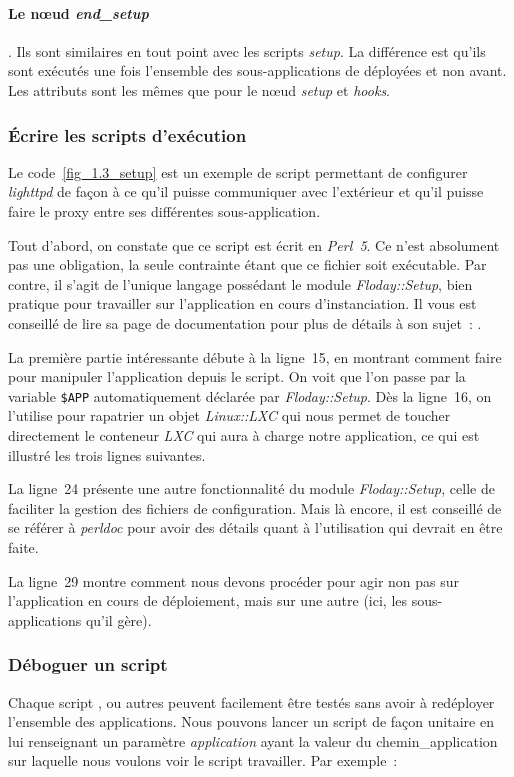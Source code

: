 \paragraph{Le nœud \emph{end\_setup}}. Ils sont similaires en tout point avec les scripts \emph{setup}. La différence est qu'ils sont exécutés une fois l'ensemble des sous-applications de déployées et non avant.
Les attributs sont les mêmes que pour le nœud \emph{setup} et \emph{hooks}.

\subsubsection{Écrire les scripts d'exécution}
 
Le code~\ref{fig_1.3_setup} est un exemple de script permettant de configurer \emph{lighttpd} de façon à ce qu'il puisse communiquer avec l'extérieur et qu'il puisse faire le proxy entre ses différentes \gls{sous-application}.



Tout d'abord, on constate que ce script est écrit en \emph{Perl~5}.
Ce n'est absolument pas une obligation, la seule contrainte étant que ce fichier soit exécutable.
Par contre, il s'agit de l'unique langage possédant le module \emph{Floday::Setup}, bien pratique pour travailler sur l'\gls{application} en cours d'instanciation.
Il vous est conseillé de lire sa page de documentation pour plus de détails à son sujet~: .

La première partie intéressante débute à la ligne~15, en montrant comment faire pour manipuler l'application depuis le script.
On voit que l'on passe par la variable {\tt\$APP} automatiquement déclarée par \emph{Floday::Setup}.
Dès la ligne~16, on l'utilise pour rapatrier un objet \emph{Linux::LXC} qui nous permet de toucher directement le conteneur \emph{LXC} qui aura à charge notre application, ce qui est illustré les trois lignes suivantes.

La ligne~24 présente une autre fonctionnalité du module \emph{Floday::Setup}, celle de faciliter la gestion des fichiers de configuration.
Mais là encore, il est conseillé de se référer à \emph{perldoc} pour avoir des détails quant à l'utilisation qui devrait en être faite.

La ligne~29 montre comment nous devons procéder pour agir non pas sur l'application en cours de déploiement, mais sur une autre (ici, les \glspl{sous-application} qu'il gère).

\subsubsection{Déboguer un script}
Chaque script ,  ou autres peuvent facilement être testés sans avoir à redéployer l'ensemble des applications.
Nous pouvons lancer un script de façon unitaire en lui renseignant un paramètre \emph{application} ayant la valeur du \gls{chemin_application} sur laquelle nous voulons voir le script travailler.
Par exemple~:

